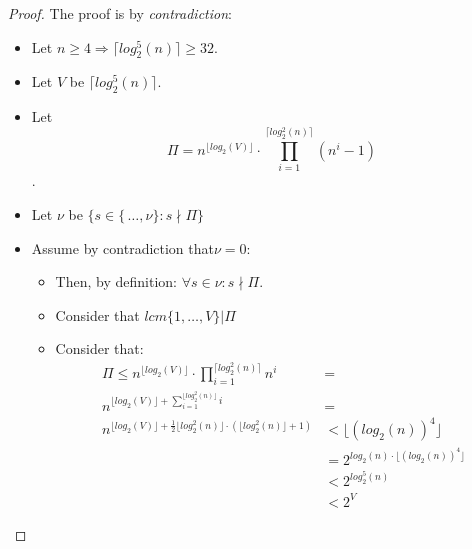 \begin{proof}
    The proof is by \emph{contradiction}:
    \begin{itemize}
        \item Let $n \geq 4 \Rightarrow \lceil log_{2}^{5}(n) \rceil \geq 32$.
        \item Let $V$ be $\lceil log_{2}^{5}(n) \rceil$.
        \item Let \[\Pi = n^{\lfloor log_{2}(V) \rfloor} \cdot \prod_{i=1}^{\lceil log_{2}^{2}(n) \rceil}(n^{i} - 1) \].
        \item Let $\nu$ be $\{s \in \{\, \dots, \nu\}: s \nmid \Pi\}$
        \item Assume by contradiction that$ \nu = 0 $:
        \begin{itemize}
            \item Then, by definition: $\forall s \in \nu: s \nmid \Pi$.
            \item Consider that $lcm\{1, \dots, V\} | \Pi$
            \item Consider that:
            \begin{align}
                \Pi \leq n^{\lfloor log_{2}(V) \rfloor} \cdot \prod_{i=1}^{\lceil log_{2}^{2}(n) \rceil} n^{i} & =\\
                n^{\lfloor log_{2}(V) \rfloor + \sum_{i=1}^{\lfloor log_{2}^{2}(n) \rfloor} i} & =  \\
                n^{\lfloor log_{2}(V) \rfloor + \frac{1}{2} \lfloor log_{2}^{2}(n) \rfloor \cdot (\lfloor log_{2}^{2}(n) \rfloor + 1)}
                & < \lfloor (log_{2}(n))^{4} \rfloor \\
                & = 2^{log_{2}(n) \cdot \lfloor (log_{2}(n))^{4} \rfloor} \\
                & < 2^{log_{2}^{5}(n)} \\
                & < 2^{V}
            \end{align}


\end{itemize}
\end{itemize}
\end{proof}
